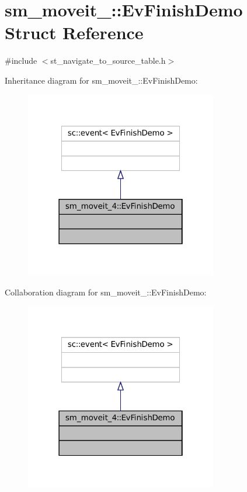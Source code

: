 \hypertarget{structsm__moveit__4_1_1EvFinishDemo}{}\section{sm\+\_\+moveit\+\_\+:\+:Ev\+Finish\+Demo Struct Reference}
\label{structsm__moveit__4_1_1EvFinishDemo}


{\ttfamily \#include $<$st\+\_\+navigate\+\_\+to\+\_\+source\+\_\+table.\+h$>$}



Inheritance diagram for sm\+\_\+moveit\+\_\+:\+:Ev\+Finish\+Demo\+:
\nopagebreak
\begin{figure}[H]
\begin{center}
\leavevmode
\includegraphics[width=238pt]{structsm__moveit__4_1_1EvFinishDemo__inherit__graph}
\end{center}
\end{figure}


Collaboration diagram for sm\+\_\+moveit\+\_\+:\+:Ev\+Finish\+Demo\+:
\nopagebreak
\begin{figure}[H]
\begin{center}
\leavevmode
\includegraphics[width=238pt]{structsm__moveit__4_1_1EvFinishDemo__coll__graph}
\end{center}
\end{figure}


